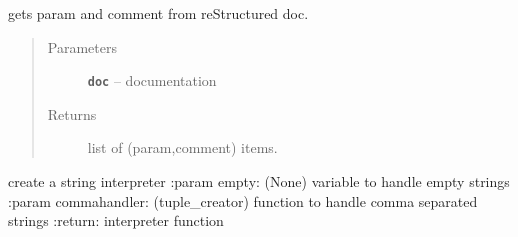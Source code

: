 \documentclass[letterpaper,10pt,english]{sphinxmanual}
\begin{document}

\begin{fulllineitems}
\label{RRtoolbox:RRtoolbox.shell.getDocParameters}
gets param and comment from reStructured doc.
\begin{quote}\begin{description}
\item[{Parameters}] \leavevmode
\textbf{\texttt{doc}} -- documentation

\item[{Returns}] \leavevmode
list of (param,comment) items.

\end{description}\end{quote}

\end{fulllineitems}


\begin{fulllineitems}
\label{RRtoolbox:RRtoolbox.shell.shell_processor}
\end{fulllineitems}


\begin{fulllineitems}
\label{RRtoolbox:RRtoolbox.shell.shell_processor_parser}
\end{fulllineitems}


\begin{fulllineitems}
\label{RRtoolbox:RRtoolbox.shell.string_interpreter}
create a string interpreter
:param empty: (None) variable to handle empty strings
:param commahandler: (tuple\_creator) function to handle comma separated strings
:return: interpreter function

\end{fulllineitems}
\end{document}
